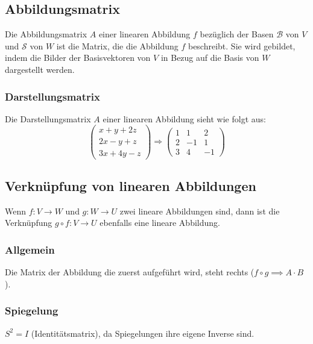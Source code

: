 \documentclass{article}
\begin{document}
\begin{minipage}[t]{0.45\textwidth}
    \subsection*{Abbildungsmatrix}
    Die Abbildungsmatrix \( A \) einer linearen Abbildung \( f \) bezüglich der Basen \( \mathcal{B} \) von \( V \) und \( \mathcal{S} \) von \( W \) ist die Matrix, 
    die die Abbildung \( f \) beschreibt. Sie wird gebildet, indem die Bilder der Basisvektoren von \( V \) in Bezug auf die Basis von \( W \) dargestellt werden.

    \subsubsection*{Darstellungsmatrix}
    Die Darstellungsmatrix \( A \) einer linearen Abbildung sieht wie folgt aus:
    \begin{equation*}
        \begin{pmatrix}
            x + y + 2z \\
            2x - y + z \\
            3x + 4y - z
        \end{pmatrix}
        \Rightarrow
        \begin{pmatrix}
            1 & 1 & 2 \\
            2 & -1 & 1 \\
            3 & 4 & -1
        \end{pmatrix}
    \end{equation*}
    \subsection*{Verknüpfung von linearen Abbildungen}
    Wenn \( f: V \to W \) und \( g: W \to U \) zwei lineare Abbildungen sind, dann ist die Verknüpfung \( g \circ f: V \to U \) ebenfalls eine lineare Abbildung.

    \subsubsection*{Allgemein}
    Die Matrix der Abbildung die zuerst aufgeführt wird, steht rechts ($f \circ g \implies A \cdot B$).

    \subsubsection*{Spiegelung}
    $S^2 = I$ (Identitätsmatrix), da Spiegelungen ihre eigene Inverse sind.


\end{minipage}
\end{document}
